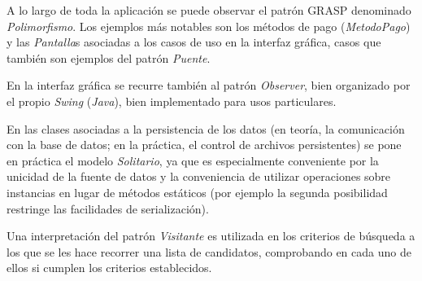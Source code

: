 \documentclass[11pt, a4paper, twoside, titlepage]{article}
\begin{document}
		A lo largo de toda la aplicación se puede observar el patrón GRASP denominado \textit{Polimorfismo}. Los ejemplos más notables son los métodos de pago (\textit{MetodoPago}) y las \textit{Pantalla}s asociadas a los casos de uso en la interfaz gráfica, casos que también son ejemplos del patrón \textit{Puente}.

		En la interfaz gráfica se recurre también al patrón \textit{Observer}, bien organizado por el propio \textit{Swing} (\textit{Java}), bien implementado para usos particulares.

		En las clases asociadas a la persistencia de los datos (en teoría, la comunicación con la base de datos; en la práctica, el control de archivos persistentes) se pone en práctica el modelo \textit{Solitario}, ya que es especialmente conveniente por la unicidad de la fuente de datos y la conveniencia de utilizar operaciones sobre instancias en lugar de métodos estáticos (por ejemplo la segunda posibilidad restringe las facilidades de serialización).

		Una interpretación del patrón \textit{Visitante} es utilizada en los criterios de búsqueda a los que se les hace recorrer una lista de candidatos, comprobando en cada uno de ellos si cumplen los criterios establecidos.
\end{document}
